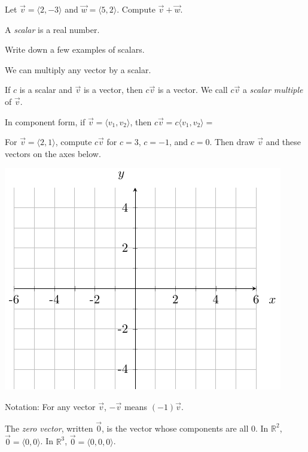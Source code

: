 \begin{ex}
    Let $\vec{v}=\langle 2,-3\rangle$ and $\vec{w}=\langle 5,2\rangle$. Compute $\vec{v}+\vec{w}$.
\end{ex}

\vspace{1in}

\begin{defn}[Scalar]
    A \emph{scalar} is a real number.
\end{defn}
\begin{ex}
    Write down a few examples of scalars.
\end{ex}

\vspace{1in}

We can multiply any vector by a scalar.
\begin{defn}
    If $c$ is a scalar and $\vec{v}$ is a vector, then $c\vec{v}$ is a vector. We call $c\vec{v}$ a \emph{scalar multiple} of $\vec{v}$.
\end{defn}

In component form, if $\vec{v}=\langle v_1,v_2\rangle$, then $c\vec{v}=c\langle v_1,v_2\rangle=\phantom{\langle c v_1, cv_2\rangle.}$

\begin{ex}\label{ex:parallel-vectors}
    For $\vec{v}=\langle 2,1\rangle$, compute $c\vec{v}$ for $c=3$, $c=-1$, and $c=0$. Then draw $\vec{v}$ and these vectors on the axes below.
\end{ex}
\mbox{} \hfill \includegraphics[width=.4\textwidth]{tikz-pictures/section-9.2-pic2-axes-for-more-vectors.pdf}

\vfill

\noindent Notation: For any vector $\vec{v}$, $-\vec{v}$ means $(-1)\vec{v}$.
\begin{defn}
    The \emph{zero vector}, written $\vec{0}$, is the vector whose components are all 0. In $\mathbb{R}^2$, $\vec{0}=\langle 0,0\rangle$. In $\mathbb{R}^3$, $\vec{0}=\langle 0,0,0\rangle$.
\end{defn}

